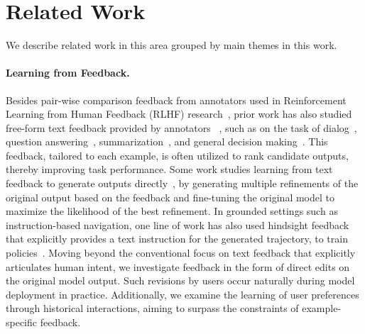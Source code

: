 \section{Related Work}

We describe related work in this area grouped by main themes in this work.


\paragraph{Learning from Feedback.} Besides pair-wise comparison feedback from annotators used in Reinforcement Learning from Human Feedback (RLHF) research~\citep[inter alia]{Ziegler2019FineTuningLM,Stiennon2020LearningTS,Nakano2021WebGPTBQ,Ouyang2022TrainingLM}, prior work has also studied free-form text feedback provided by annotators ~\citep{Fernandes2023BridgingTG}, such as on the task of dialog~\citep{Weston2016DialogbasedLL,Li2016DialogueLW,Hancock2019LearningFD,Xu2022LearningNS,Petrak2023LearningFF}, question answering~\citep{Li2022UsingIF,Malaviya2023PachinkoPI}, summarization~\citep{Saunders2022SelfcritiquingMF}, and general decision making~\citep{cheng2023llf}. This feedback, tailored to each example, is often utilized to rank candidate outputs, thereby improving task performance. Some work studies learning from text feedback to generate outputs directly~\citep{Scheurer2023TrainingLM,Bai2022ConstitutionalAH,Shi2022WhenLG}, by generating multiple refinements of the original output based on the feedback and fine-tuning the original model to maximize the likelihood of the best refinement. In grounded settings such as instruction-based navigation, one line of work has also used hindsight feedback that explicitly provides a text instruction for the generated trajectory, to train policies~\citep{nguyen2021interactive,misra2024provable}. Moving beyond the conventional focus on text feedback that explicitly articulates human intent, we investigate feedback in the form of direct edits on the original model output. Such revisions by users occur naturally during model deployment in practice.  Additionally, we examine the learning of user preferences through historical interactions, aiming to surpass the constraints of example-specific feedback.

